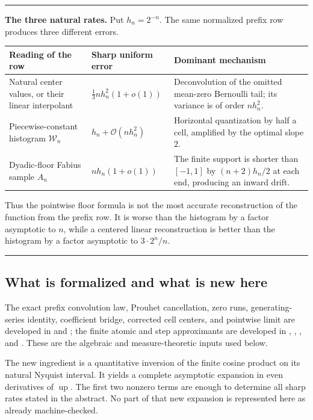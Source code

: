 \documentclass[11pt,oneside]{article}
\theoremstyle{definition}
\theoremstyle{remark}
\newcommand{\Up}{\operatorname{up}}
\newcommand{\bigO}{\mathcal O}
\newenvironment{boxedremark}{%
  \par\smallskip\noindent\begin{center}\begin{minipage}{0.94\textwidth}%
  \color{black}\hrule\vspace{0.6em}\small
}{%
  \vspace{0.6em}\hrule\end{minipage}\end{center}\smallskip
}
\begin{document}
\begin{boxedremark}
\textbf{The three natural rates.}
Put $h_n=2^{-n}$.  The same normalized prefix row produces three different errors.
\begin{center}
\begin{tabularx}{0.95\textwidth}{@{}>{\raggedright\arraybackslash}p{}
>{\raggedright\arraybackslash}p{}X@{}}
\toprule
Reading of the row & Sharp uniform error & Dominant mechanism\\
\midrule
Natural center values, or their linear interpolant
& $\displaystyle \frac13 n h_n^2(1+o(1))$
& Deconvolution of the omitted mean-zero Bernoulli tail; its variance is of order $nh_n^2$.\\[0.35em]
Piecewise-constant histogram $\mathcal W_n$
& $\displaystyle h_n+\bigO(nh_n^2)$
& Horizontal quantization by half a cell, amplified by the optimal slope $2$.\\[0.35em]
Dyadic-floor Fabius sample $A_n$
& $\displaystyle n h_n(1+o(1))$
& The finite support is shorter than $[-1,1]$ by $(n+2)h_n/2$ at each end, producing an inward drift.\\
\bottomrule
\end{tabularx}
\end{center}
Thus the pointwise floor formula is not the most accurate reconstruction of the function from
the prefix row.  It is worse than the histogram by a factor asymptotic to $n$, while a
centered linear reconstruction is better than the histogram by a factor asymptotic to
$3\cdot2^n/n$.
\end{boxedremark}

\subsection{What is formalized and what is new here}

The exact prefix convolution law, Prouhet cancellation, zero runs, generating-series identity,
coefficient bridge, corrected cell centers, and pointwise limit are developed in
 and ; the finite atomic and step
approximants are developed in ,
, , and
 \cite{tmrates:proveit}.  These are the algebraic and
measure-theoretic inputs used below.

The new ingredient is a quantitative inversion of the finite cosine product on its natural
Nyquist interval.  It yields a complete asymptotic expansion in even derivatives of $\Up$.
The first two nonzero terms are enough to determine all sharp rates stated in the abstract.
No part of that new expansion is represented here as already machine-checked.
\end{document}
